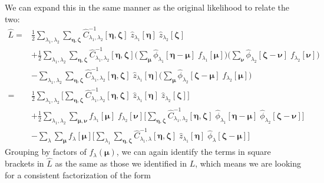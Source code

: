\documentclass[DM,authoryear,toc]{lsstdoc}
\begin{document}
We can expand this in the same manner as the original likelihood to relate the two:
\begin{align}
\hat{L} =&
    \frac{1}{2}\sum_{\lambda_1,\lambda_2}\sum_{\bm{\eta},\bm{\zeta}}
    \hat{C}^{-1}_{\lambda_1,\lambda_2}[\bm{\eta},\bm{\zeta}]
    \;\hat{z}_{\lambda_1}[\bm{\eta}]
    \;\hat{z}_{\lambda_2}[\bm{\zeta}]
    \nonumber\\
    &+
    \frac{1}{2}\sum_{\lambda_1,\lambda_2}\sum_{\bm{\eta},\bm{\zeta}}
    \hat{C}^{-1}_{\lambda_1,\lambda_2}[\bm{\eta},\bm{\zeta}]
    \bigg(
        \sum_{\bm{\mu}}
        \hat{\phi}_{\lambda_1}[\bm{\eta}-\bm{\mu}]
        \; f_{\lambda_1}[\bm{\mu}]
    \bigg)
    \bigg(
        \sum_{\bm{\nu}}
        \hat{\phi}_{\lambda_2}[\bm{\zeta}-\bm{\nu}]
        \; f_{\lambda_2}[\bm{\nu}]
    \bigg)
    \nonumber\\
    &-
    \sum_{\lambda_1,\lambda_2}\sum_{\bm{\eta},\bm{\zeta}}
    \hat{C}^{-1}_{\lambda_1,\lambda_2}[\bm{\eta},\bm{\zeta}]
    \;\hat{z}_{\lambda_1}[\bm{\eta}]
    \bigg(
        \sum_{\bm{\mu}}
        \hat{\phi}_{\lambda_2}[\bm{\zeta}-\bm{\mu}]
        \; f_{\lambda_2}[\bm{\mu}]
    \bigg)
    \\
    =&
    \frac{1}{2}\sum_{\lambda_1,\lambda_2}
    \Bigg[
        \sum_{\bm{\eta},\bm{\zeta}}
        \hat{C}^{-1}_{\lambda_1,\lambda_2}[\bm{\eta},\bm{\zeta}]
        \;\hat{z}_{\lambda_1}[\bm{\eta}]
        \;\hat{z}_{\lambda_2}[\bm{\zeta}]
    \Bigg]
    \nonumber\\
    &+
    \frac{1}{2}\sum_{\lambda_1,\lambda_2}
        \sum_{\bm{\mu},\bm{\nu}}
        f_{\lambda_1}[\bm{\mu}]
        \; f_{\lambda_2}[\bm{\nu}]
    \Bigg[
        \sum_{\bm{\eta},\bm{\zeta}}
        \hat{C}^{-1}_{\lambda_1,\lambda_2}[\bm{\eta},\bm{\zeta}]
        \;\hat{\phi}_{\lambda_1}[\bm{\eta}-\bm{\mu}]
        \;\hat{\phi}_{\lambda_2}[\bm{\zeta}-\bm{\nu}]
    \Bigg]
    \nonumber\\
    &-
    \sum_{\lambda}
    \sum_{\bm{\mu}}
        f_{\lambda}[\bm{\mu}]
    \Bigg[
        \sum_{\lambda_1}
        \sum_{\bm{\eta},\bm{\zeta}}
        \hat{C}^{-1}_{\lambda_1,\lambda}[\bm{\eta},\bm{\zeta}]
        \;\hat{z}_{\lambda_1}[\bm{\eta}]
        \; \hat{\phi}_{\lambda}[\bm{\zeta}-\bm{\mu}]
    \Bigg]
\end{align}
Grouping by factors of $f_{\lambda}(\bm{\mu})$, we can again identify the terms in square brackets in $\hat{L}$ as the same as those we identified in $L$, which means we are looking for a consistent factorization of the form
\end{document}
